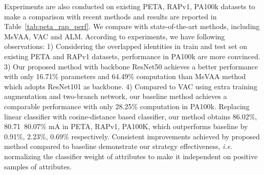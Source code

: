 \documentclass[runningheads]{llncs}
\begin{document}
 Experiments are also conducted on existing PETA, RAPv1, PA100k datasets to make a comparison with recent methods and results are reported in Table~\ref{tab:peta_rap_perf}. We compare with state-of-the-art methods, including MsVAA\cite{sarafianos2018deep}, VAC \cite{guo2019visual} and ALM\cite{tang2019Improving}. According to experiments, we have following observations: 
1) Considering the overlapped identities in train and test set on existing PETA and RAPv1 datasets, performance in PA100k are more convinced.
3) Our proposed method with backbone ResNet50 achieves a better performance with only 16.71\% parameters and 64.49\% computation than  MsVAA method which adopts ResNet101 as backbone.
4) Compared to VAC \cite{guo2019visual} using extra training augmentation and two-branch network, our baseline method achieves a comparable performance with only 28.25\% computation in PA100k. 
 Replacing linear classifier with cosine-distance based classifier, our method obtains 86.02\%, 80.71\, 80.07\% mA in PETA, RAPv1, PA100K, which outperforms baseline by 0.91\%, 2.23\%, 0.69\% respectively. Consistent improvements achieved by proposed method compared to baseline demonstrate our strategy effectiveness, \textit{i.e.} normalizing the classifier weight of attributes to make it independent on positive samples of attributes.
 
\end{document}
